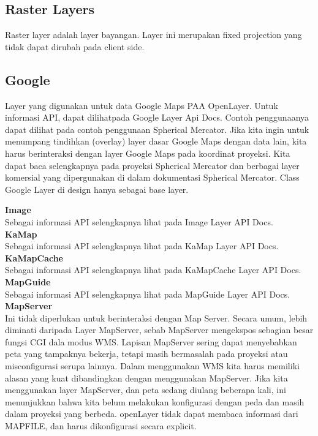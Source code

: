 \subsection {Raster Layers}
Raster layer adalah layer bayangan. Layer ini merupakan fixed projection yang tidak dapat dirubah pada client side.

\subsection {Google}
Layer yang digunakan untuk data Google Maps PAA OpenLayer. Untuk informasi API, dapat dilihatpada Google Layer Api Docs. 
Contoh penggunaanya dapat dilihat pada contoh penggunaan Spherical Mercator.
Jika kita ingin untuk menumpang tindihkan (overlay) layer dasar Google Maps dengan data lain, kita harus berinteraksi dengan layer Google Maps pada koordinat proyeksi.
Kita dapat baca selengkapnya pada proyeksi Spherical Mercator dan berbagai layer komersial yang dipergunakan di dalam dokumentasi Spherical Mercator.
Class Google Layer di design hanya sebagai base layer.

\textbf{Image} \\
Sebagai informasi API selengkapnya lihat pada Image Layer API Docs.\\
\textbf{KaMap} \\
Sebagai informasi API selengkapnya lihat pada KaMap Layer API Docs.\\
\textbf{KaMapCache} \\
Sebagai informasi API selengkapnya lihat pada KaMapCache Layer API Docs.\\
\textbf{MapGuide} \\
Sebagai informasi API selengkapnya lihat pada MapGuide Layer API Docs.\\
\textbf{MapServer} \\
Ini tidak diperlukan untuk berinteraksi dengan Map Server. Secara umum, lebih diminati daripada Layer MapServer, sebab MapServer mengekspos sebagian besar fungsi CGI dala modus WMS.
Lapisan MapServer sering dapat menyebabkan peta yang tampaknya bekerja, tetapi masih bermasalah pada proyeksi atau misconfigurasi serupa lainnya.
Dalam menggunakan WMS kita harus memiliki alasan yang kuat dibandingkan dengan menggunakan MapServer.
Jika kita menggunakan layer MapServer, dan peta sedang diulang beberapa kali, ini menunjukkan bahwa kita belum melakukan konfigurasi dengan peda dan masih dalam proyeksi yang berbeda.
openLayer tidak dapat membaca informasi dari MAPFILE, dan harus dikonfigurasi secara explicit.\\


